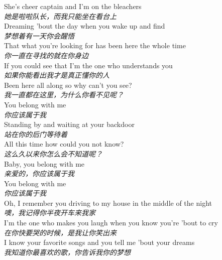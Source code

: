 \begin{spacing}{1.5}
\begin{flushleft}
She's cheer captain and I'm on the bleachers\\
\textit{她是啦啦队长，而我只能坐在看台上}\\[0.5em]

Dreaming 'bout the day when you wake up and find\\
\textit{梦想着有一天你会醒悟}\\[0.5em]

That what you're looking for has been here the whole time\\
\textit{你一直在寻找的就在你身边}\\[0.5em]

If you could see that I'm the one who understands you\\
\textit{如果你能看出我才是真正懂你的人}\\[0.5em]

Been here all along so why can't you see?\\
\textit{我一直都在这里，为什么你看不见呢？}\\[0.5em]

You belong with me\\
\textit{你应该属于我}\\[0.5em]

Standing by and waiting at your backdoor\\
\textit{站在你的后门等待着}\\[0.5em]

All this time how could you not know?\\
\textit{这么久以来你怎么会不知道呢？}\\[0.5em]

Baby, you belong with me\\
\textit{亲爱的，你应该属于我}\\[0.5em]

You belong with me\\
\textit{你应该属于我}\\[0.5em]

Oh, I remember you driving to my house in the middle of the night\\
\textit{噢，我记得你半夜开车来我家}\\[0.5em]

I'm the one who makes you laugh when you know you're 'bout to cry\\
\textit{在你快要哭的时候，是我让你笑出来}\\[0.5em]

I know your favorite songs and you tell me 'bout your dreams\\
\textit{我知道你最喜欢的歌，你告诉我你的梦想}\\[0.5em]


\end{flushleft}
\end{spacing}
